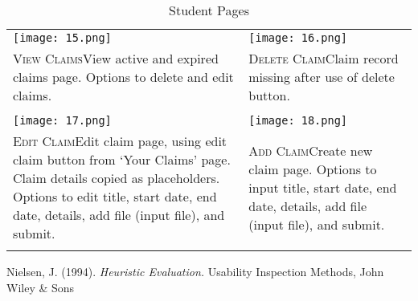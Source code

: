 \documentclass[11pt, english]{article}
\begin{document}
	\begin{center}
                \scriptsize
        \begin{longtable}{p{7cm}p{7cm}}
		\texttt{[image: 15.png]} & \texttt{[image: 16.png]}\\
		\textsc{View Claims}\newline View active and expired claims page. Options to delete and edit claims. & \textsc{Delete Claim}\newline Claim record missing after use of delete button.\\
		& \\
		\texttt{[image: 17.png]} & \texttt{[image: 18.png]}\\
		 \textsc{Edit Claim}\newline Edit claim page, using edit claim button from `Your Claims' page. Claim details copied as placeholders. Options to edit title, start date, end date, details, add file (input file), and submit. & \textsc{Add Claim}\newline Create new claim page. Options to input title, start date, end date, details, add file (input file), and submit.\\
                \caption{Student Pages}
        \end{longtable}
        \end{center}

\renewcommand\refname{Bibliography}

\begin{thebibliography}{9}

                Nielsen, J. (1994).
                \textsl{Heuristic Evaluation.}
		Usability Inspection Methods, John Wiley \& Sons

\end{thebibliography}
\end{document}
